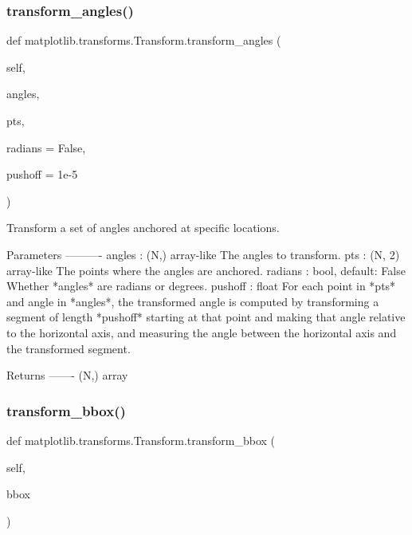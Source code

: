\subsubsection{\texorpdfstring{transform\+\_\+angles()}{transform\_angles()}}
{\footnotesize\ttfamily def matplotlib.\+transforms.\+Transform.\+transform\+\_\+angles (\begin{DoxyParamCaption}\item[{}]{self,  }\item[{}]{angles,  }\item[{}]{pts,  }\item[{}]{radians = {\ttfamily False},  }\item[{}]{pushoff = {\ttfamily 1e-\/5} }\end{DoxyParamCaption})}

\begin{DoxyVerb}Transform a set of angles anchored at specific locations.

Parameters
----------
angles : (N,) array-like
    The angles to transform.
pts : (N, 2) array-like
    The points where the angles are anchored.
radians : bool, default: False
    Whether *angles* are radians or degrees.
pushoff : float
    For each point in *pts* and angle in *angles*, the transformed
    angle is computed by transforming a segment of length *pushoff*
    starting at that point and making that angle relative to the
    horizontal axis, and measuring the angle between the horizontal
    axis and the transformed segment.

Returns
-------
(N,) array
\end{DoxyVerb}
 \mbox{\label{classmatplotlib_1_1transforms_1_1Transform_a02f3d6a939960103da7e6e0c617e3298}} 
\subsubsection{\texorpdfstring{transform\+\_\+bbox()}{transform\_bbox()}}
{\footnotesize\ttfamily def matplotlib.\+transforms.\+Transform.\+transform\+\_\+bbox (\begin{DoxyParamCaption}\item[{}]{self,  }\item[{}]{bbox }\end{DoxyParamCaption})}

